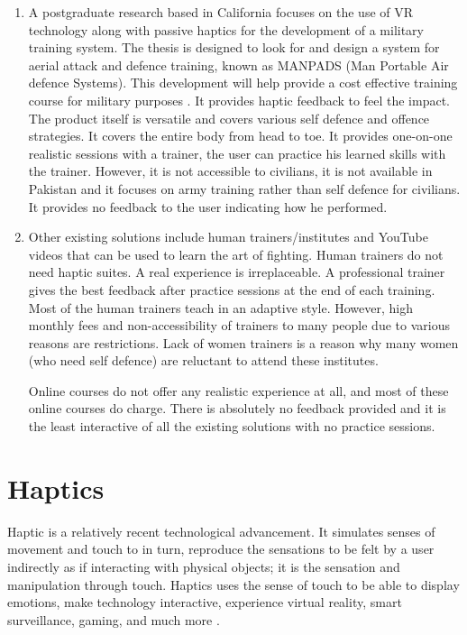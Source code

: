\begin{enumerate}
    \item A postgraduate research based in California focuses on the use of VR technology along with passive haptics for the development of a military training system. The thesis is designed to look for and design a system for aerial attack and defence training, known as MANPADS (Man Portable Air defence Systems). This development will help provide a cost effective training course for military purposes \cite{manpads}. It provides haptic feedback to feel the impact. The product itself is versatile and covers various self defence and offence strategies. It covers the entire body from head to toe. It provides one-on-one realistic sessions with a trainer, the user can practice his learned skills with the trainer. However, it is not accessible to civilians, it is not available in Pakistan and it focuses on army training rather than self defence for civilians. It provides no feedback to the user indicating how he performed. 
    
    \item Other existing solutions include human trainers/institutes and YouTube videos that can be used to learn the art of fighting. Human trainers do not need haptic suites. A real experience is irreplaceable. A professional trainer gives the best feedback after practice sessions at the end of each training. Most of the human trainers teach in an adaptive style. However, high monthly fees and non-accessibility of trainers to many people due to various reasons are restrictions. Lack of women trainers is a reason why many women (who need self defence) are reluctant to attend these institutes. 
    
    Online courses do not offer any realistic experience at all, and most of these online courses do charge. There is absolutely no feedback provided and it is the least interactive of all the existing solutions with no practice sessions.
\end{enumerate}

\section{Haptics}
\label{section:hapticLit}
Haptic is a relatively recent technological advancement. It simulates senses of movement and touch to in turn, reproduce the sensations to be felt by a user indirectly as if interacting with physical objects; it is the sensation and manipulation through touch. Haptics uses the sense of touch to be able to display emotions, make technology interactive, experience virtual reality, smart surveillance, gaming, and much more \cite{affHaptics}. 


